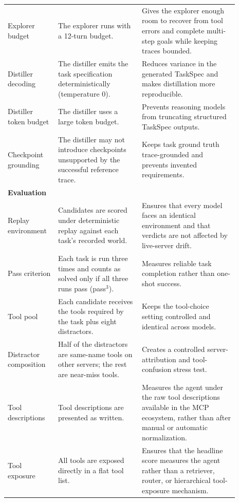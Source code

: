 \begin{table}[t]
\begin{tabular}{p{0.18\linewidth}p{0.33\linewidth}p{0.38\linewidth}}
Explorer budget &
The explorer runs with a 12-turn budget. &
Gives the explorer enough room to recover from tool errors and complete
multi-step goals while keeping traces bounded. \\

Distiller decoding &
The distiller emits the task specification deterministically
(temperature 0). &
Reduces variance in the generated TaskSpec and makes distillation more
reproducible. \\

Distiller token budget &
The distiller uses a large token budget. &
Prevents reasoning models from truncating structured TaskSpec outputs. \\

Checkpoint grounding &
The distiller may not introduce checkpoints unsupported by the successful
reference trace. &
Keeps task ground truth trace-grounded and prevents invented requirements. \\

\midrule
\multicolumn{3}{l}{\textbf{Evaluation}} \\
\midrule

Replay environment &
Candidates are scored under deterministic replay against each task's recorded
world. &
Ensures that every model faces an identical environment and that verdicts are
not affected by live-server drift. \\

Pass criterion &
Each task is run three times and counts as solved only if all three runs pass
(pass$^3$). &
Measures reliable task completion rather than one-shot success. \\

Tool pool &
Each candidate receives the tools required by the task plus eight distractors. &
Keeps the tool-choice setting controlled and identical across models. \\

Distractor composition &
Half of the distractors are same-name tools on other servers; the rest are
near-miss tools. &
Creates a controlled server-attribution and tool-confusion stress test. \\

Tool descriptions &
Tool descriptions are presented as written. &
Measures the agent under the raw tool descriptions available in the MCP
ecosystem, rather than after manual or automatic normalization. \\

Tool exposure &
All tools are exposed directly in a flat tool list. &
Ensures that the headline score measures the agent rather than a retriever,
router, or hierarchical tool-exposure mechanism. \\


\end{tabular}
\end{table}
